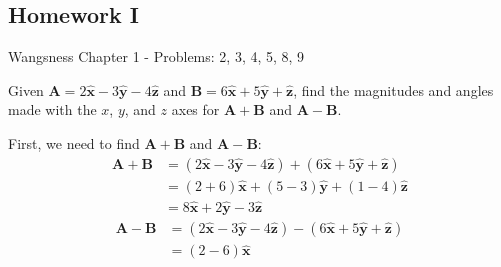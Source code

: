 \documentclass[crop=false,class=book,oneside]{standalone}
\begin{document}
        \subsection{Homework I}
            Wangsness Chapter 1 - Problems: 2, 3, 4, 5, 8, 9
            \begin{problem}
                Given
                $\mathbf{A}%
                 =2\hat{\mathbf{x}}-3\hat{\mathbf{y}}%
                 -4\hat{\mathbf{z}}$
                and
                $\mathbf{B}%
                 =6\hat{\mathbf{x}}+5\hat{\mathbf{y}}%
                 +\hat{\mathbf{z}}$,
                find the magnitudes and angles made with the $x$,
                $y$, and $z$ axes for $\mathbf{A}+\mathbf{B}$
                and $\mathbf{A}-\mathbf{B}$.
            \end{problem}
            \begin{solution}
                First, we need to find $\mathbf{A}+\mathbf{B}$
                and $\mathbf{A}-\mathbf{B}$:
                \begin{subequations}
                    \begin{align}
                        \mathbf{A}+\mathbf{B}
                        &
                        =(2\hat{\mathbf{x}}
                        -3\hat{\mathbf{y}}
                        -4\hat{\mathbf{z}})
                        +(6\hat{\mathbf{x}}
                        +5\hat{\mathbf{y}}
                        +\hat{\mathbf{z}})\\
                        &
                        =(2+6)\hat{\mathbf{x}}
                        +(5-3)\hat{\mathbf{y}}
                        +(1-4)\hat{\mathbf{z}}\\
                        &
                        =8\hat{\mathbf{x}}
                        +2\hat{\mathbf{y}}
                        -3\hat{\mathbf{z}}
                    \end{align}
                \end{subequations}
                \begin{subequations}
                    \begin{align}
                        \mathbf{A}-\mathbf{B}
                        &
                        =(2\hat{\mathbf{x}}
                        -3\hat{\mathbf{y}}
                        -4\hat{\mathbf{z}})
                        -(6\hat{\mathbf{x}}
                        +5\hat{\mathbf{y}}
                        +\hat{\mathbf{z}})\\
                        &=(2-6)\hat{\mathbf{x}}

\end{align}
\end{subequations}
\end{solution}
\end{document}
